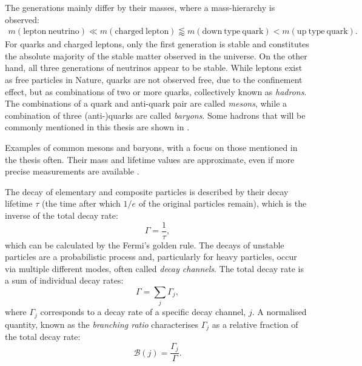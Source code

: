The generations mainly differ by their masses, where a mass-hierarchy is observed: 
\begin{align*}
    m(\mathrm{lepton~neutrino})\ll m(\mathrm{charged~lepton})\lessapprox m(\mathrm{down~type~quark})<m(\mathrm{up~type~quark}).
\end{align*}
For quarks and charged leptons, only the first generation is stable and constitutes the absolute majority of the stable matter observed in the universe.
On the other hand, all three generations of neutrinos appear to be stable.
While leptons exist as free particles in Nature, quarks are not observed free, due to the confinement effect, 
but as combinations of two or more quarks, collectively known as \textit{hadrons}.
The combinations of a quark and anti-quark pair are called \textit{mesons}, while a combination of three (anti-)quarks are called \textit{baryons}.
Some hadrons that will be commonly mentioned in this thesis are shown in .
\begin{table}[htbp!]
    \centering
    \caption{\label{tab:hadrons}
    Examples of common mesons and baryons, with a focus on those mentioned in the thesis often.
    Their mass and lifetime values are approximate, even if more precise measurements are available \cite{Workman:2022ynf}.
    }
    
\end{table}

The decay of elementary and composite particles is described by their decay lifetime $\tau$ (the time after which $1/e$ of the original particles remain), 
which is the inverse of the total decay rate:
\begin{equation}
    \Gamma = \frac{1}{\tau},
\end{equation}
which can be calculated by the Fermi's golden rule.
The decays of unstable particles are a probabilistic process and, particularly for heavy particles, occur via multiple different modes, often called \textit{decay channels}.
The total decay rate is a sum of individual decay rates:
\begin{equation}
    \Gamma = \sum_j\Gamma_j,
\end{equation}
where $\Gamma_j$ corresponds to a decay rate of a specific decay channel, $j$.
A normalised quantity, known as the \textit{branching ratio} characterises $\Gamma_j$ as a relative fraction of the total decay rate:
\begin{equation}\label{eq:branching_fraction_definition}
    \mathcal{B}(j) = \frac{\Gamma_j}{\Gamma}.
\end{equation}

